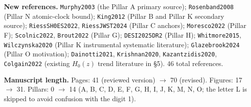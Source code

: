 \documentclass[12pt,a4paper]{article}
\begin{document}
\textbf{New references.}
\texttt{Murphy2003} (the Pillar A primary source);
\texttt{Rosenband2008} (Pillar N atomic-clock bound);
\texttt{King2012} (Pillar B and Pillar K secondary source);
\texttt{RiessSH0ES2022}, \texttt{RiessJWST2024} (Pillar C anchors);
\texttt{Moresco2022} (Pillar F);
\texttt{Scolnic2022}, \texttt{Brout2022} (Pillar G);
\texttt{DESI2025DR2} (Pillar H);
\texttt{Whitmore2015}, \texttt{Wilczynska2020} (Pillar K instrumental systematic literature);
\texttt{Glazebrook2024} (Pillar O motivation);
\texttt{Dainotti2021}, \texttt{Krishnan2020}, \texttt{Kazantzidis2020}, \texttt{Colgain2022} (existing $H_0(z)$ trend literature in §5).
46 total references.

\textbf{Manuscript length.}
Pages: 41 (reviewed version) $\to$ 70 (revised).
Figures: 17 $\to$ 31.
Pillars: 0 $\to$ 14 (A, B, C, D, E, F, G, H, I, J, K, M, N, O; the letter L is skipped to avoid confusion with the digit 1).
\end{document}
